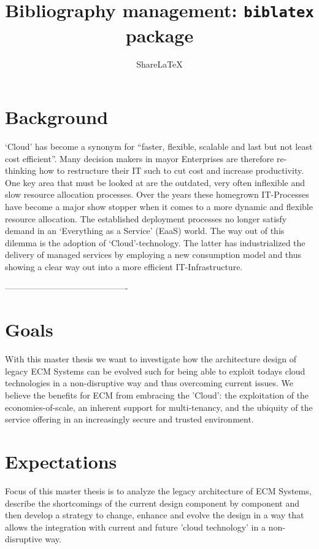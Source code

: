 \documentclass{article}
\title{Bibliography management: \texttt{biblatex} package}
\author{Share\LaTeX}
\date{ }
\begin{document}
\maketitle

\tableofcontents

\section{Background}
‘Cloud’ has become a synonym for “faster, flexible, scalable and last but not least cost efficient”. Many decision makers in mayor Enterprises are therefore re-thinking how to restructure their IT such to cut cost and increase productivity. One key area that must be looked at are the outdated, very often inflexible and slow resource allocation processes. Over the years these homegrown IT-Processes have become a major show stopper when it comes to a more dynamic and flexible resource allocation. The established deployment processes no longer satisfy demand in an ‘Everything as a Service’ (EaaS) world. The way out of this dilemma is the adoption of ‘Cloud’-technology. The latter has industrialized the delivery of managed services by employing a new consumption model and thus showing a clear way out into a more efficient IT-Infrastructure. 

-------------------------------------------
\section{Goals}
With this master thesis we want to investigate how the architecture design of legacy ECM Systems can be evolved such for being able to exploit todays cloud technologies in a non-disruptive way and thus overcoming current issues.  We believe the benefits for ECM from embracing the 'Cloud': the exploitation of the economies-of-scale, an inherent support for multi-tenancy, and the ubiquity of the service offering in an increasingly secure and trusted environment. 

\section{Expectations}
Focus of this master thesis is to analyze the legacy architecture of ECM Systems, describe the shortcomings of the current design component by component and then develop a strategy to change, enhance and evolve the design in a way that allows the integration with current and future 'cloud technology’ in a non-disruptive way.  
\end{document}
